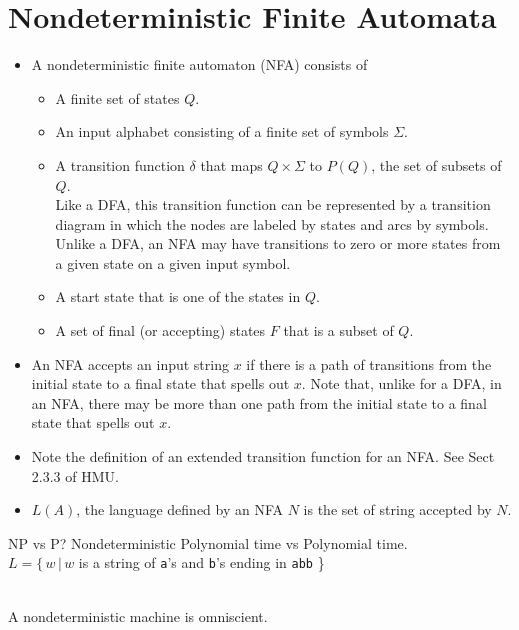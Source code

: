 \documentclass[]{article}
\begin{document}
\section{Nondeterministic Finite Automata}
  \begin{itemize}
    \item A nondeterministic finite automaton (NFA) consists of
      \begin{itemize}
        \item A finite set of states $Q$.
        \item An input alphabet consisting of a finite set of symbols
        $\Sigma$.
        \item A transition function $\delta$ that maps $Q \times \Sigma$ to
        $P(Q)$, the set of subsets of $Q$. \\
        Like a DFA, this transition function can be represented by a
        transition diagram in which the nodes are labeled by states and arcs
        by symbols. Unlike a DFA, an NFA may have transitions to zero or more
        states from a given state on a given input symbol.
        \item A start state that is one of the states in $Q$.
        \item A set of final (or accepting) states $F$ that is a subset of
        $Q$.
      \end{itemize}
    \item An NFA accepts an input string $x$ if there is a path of transitions
    from the initial state to a final state that spells out $x$. Note that,
    unlike for a DFA, in an NFA, there may be more than one path from the
    initial state to a final state that spells out $x$.
    \item Note the definition of an extended transition function for an NFA.
    See Sect 2.3.3 of HMU.
    \item $L(A)$, the language defined by an NFA $N$ is the set of string
    accepted by $N$.
  \end{itemize}
  NP vs P? Nondeterministic Polynomial time vs Polynomial time.\\
  $L = \{\, w \, | \, w$ is a string of \texttt{a}'s and \texttt{b}'s ending
  in \texttt{abb} \} \\
   \\
  A nondeterministic machine is omniscient.
\end{document}
